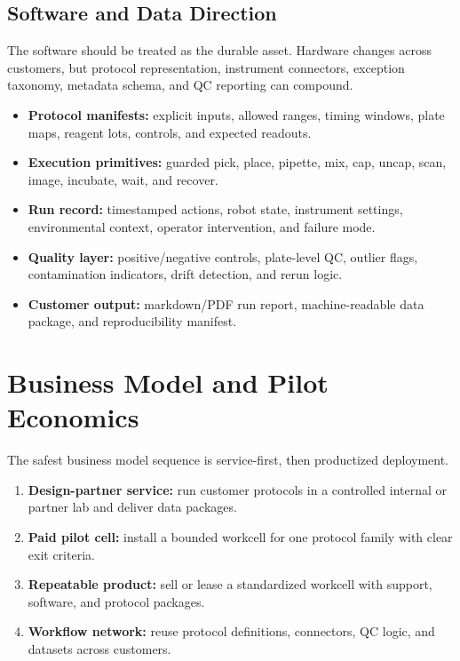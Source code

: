 \documentclass[11pt]{article}
\begin{document}
\subsection{Software and Data Direction}

The software should be treated as the durable asset. Hardware changes across customers, but protocol representation, instrument connectors, exception taxonomy, metadata schema, and QC reporting can compound.

\begin{itemize}
  \item \textbf{Protocol manifests:} explicit inputs, allowed ranges, timing windows, plate maps, reagent lots, controls, and expected readouts.
  \item \textbf{Execution primitives:} guarded pick, place, pipette, mix, cap, uncap, scan, image, incubate, wait, and recover.
  \item \textbf{Run record:} timestamped actions, robot state, instrument settings, environmental context, operator intervention, and failure mode.
  \item \textbf{Quality layer:} positive/negative controls, plate-level QC, outlier flags, contamination indicators, drift detection, and rerun logic.
  \item \textbf{Customer output:} markdown/PDF run report, machine-readable data package, and reproducibility manifest.
\end{itemize}

\section{Business Model and Pilot Economics}

The safest business model sequence is service-first, then productized deployment.

\begin{enumerate}
  \item \textbf{Design-partner service:} run customer protocols in a controlled internal or partner lab and deliver data packages.
  \item \textbf{Paid pilot cell:} install a bounded workcell for one protocol family with clear exit criteria.
  \item \textbf{Repeatable product:} sell or lease a standardized workcell with support, software, and protocol packages.
  \item \textbf{Workflow network:} reuse protocol definitions, connectors, QC logic, and datasets across customers.
\end{enumerate}
\end{document}
